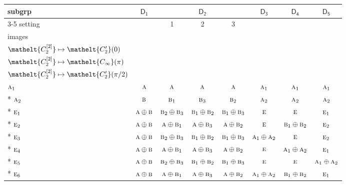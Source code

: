 \documentclass[10pt,a4paper]{article}
\numberwithin{equation}{section}
\newcommand{\eltfont}[1]{{\let\sigma\eltsigma\mathelt{#1}}}
\newcommand{\grp}[1]{\mathsf{#1}}
\newcommand{\irr}[1]{\text{\normalfont\scshape #1}}
\newcommand{\cls}[1]{\eltfont{#1}}
\newcommand{\elt}[1]{\eltfont{#1}}
\newcommand{\genidx}[2]{#1^{[\mathrm{#2}]}}
\begin{document}
{\small\begin{longtable}{@{}lccccccc@{}}\toprule
subgrp & \href{D1.pdf}{$\grp{D_{1}}$} & \multicolumn{3}{c}{\href{D2.pdf}{$\grp{D_{2}}$}} & \href{D3.pdf}{$\grp{D_{3}}$} & \href{D4.pdf}{$\grp{D_{4}}$} & \href{D5.pdf}{$\grp{D_{5}}$}\\\cmidrule(lr){3-5}
setting &  & 1 & 2 & 3 &  &  & \\
images &  & {\scriptsize\begin{tabular}[t]{@{}c@{}}$\cls{\genidx{C_{2}}{1}} \mapsto \elt{C_{\infty}}(\pi)$\\$\cls{\genidx{C_{2}}{2}} \mapsto \elt{C_2'}(0)$\end{tabular}} & {\scriptsize\begin{tabular}[t]{@{}c@{}}$\cls{\genidx{C_{2}}{1}} \mapsto \elt{C_2'}(0)$\\$\cls{\genidx{C_{2}}{2}} \mapsto \elt{C_{\infty}}(\pi)$\end{tabular}} & {\scriptsize\begin{tabular}[t]{@{}c@{}}$\cls{\genidx{C_{2}}{1}} \mapsto \elt{C_2'}(0)$\\$\cls{\genidx{C_{2}}{2}} \mapsto \elt{C_2'}(\pi/2)$\end{tabular}} &  &  & \\\midrule\endhead
\bottomrule\endfoot\endlastfoot
$\irr{a}_{1}$ & $\irr{a}$ & $\irr{a}$ & $\irr{a}$ & $\irr{a}$ & $\irr{a}_{1}$ & $\irr{a}_{1}$ & $\irr{a}_{1}$\\*
$\irr{a}_{2}$ & $\irr{b}$ & $\irr{b}_{1}$ & $\irr{b}_{3}$ & $\irr{b}_{2}$ & $\irr{a}_{2}$ & $\irr{a}_{2}$ & $\irr{a}_{2}$\\*
$\irr{e}_{1}$ & $\irr{a}\oplus \irr{b}$ & $\irr{b}_{2}\oplus \irr{b}_{3}$ & $\irr{b}_{1}\oplus \irr{b}_{2}$ & $\irr{b}_{1}\oplus \irr{b}_{3}$ & $\irr{e}$ & $\irr{e}$ & $\irr{e}_{1}$\\*
$\irr{e}_{2}$ & $\irr{a}\oplus \irr{b}$ & $\irr{a}\oplus \irr{b}_{1}$ & $\irr{a}\oplus \irr{b}_{3}$ & $\irr{a}\oplus \irr{b}_{2}$ & $\irr{e}$ & $\irr{b}_{1}\oplus \irr{b}_{2}$ & $\irr{e}_{2}$\\*
$\irr{e}_{3}$ & $\irr{a}\oplus \irr{b}$ & $\irr{b}_{2}\oplus \irr{b}_{3}$ & $\irr{b}_{1}\oplus \irr{b}_{2}$ & $\irr{b}_{1}\oplus \irr{b}_{3}$ & $\irr{a}_{1}\oplus \irr{a}_{2}$ & $\irr{e}$ & $\irr{e}_{2}$\\*
$\irr{e}_{4}$ & $\irr{a}\oplus \irr{b}$ & $\irr{a}\oplus \irr{b}_{1}$ & $\irr{a}\oplus \irr{b}_{3}$ & $\irr{a}\oplus \irr{b}_{2}$ & $\irr{e}$ & $\irr{a}_{1}\oplus \irr{a}_{2}$ & $\irr{e}_{1}$\\*
$\irr{e}_{5}$ & $\irr{a}\oplus \irr{b}$ & $\irr{b}_{2}\oplus \irr{b}_{3}$ & $\irr{b}_{1}\oplus \irr{b}_{2}$ & $\irr{b}_{1}\oplus \irr{b}_{3}$ & $\irr{e}$ & $\irr{e}$ & $\irr{a}_{1}\oplus \irr{a}_{2}$\\*
$\irr{e}_{6}$ & $\irr{a}\oplus \irr{b}$ & $\irr{a}\oplus \irr{b}_{1}$ & $\irr{a}\oplus \irr{b}_{3}$ & $\irr{a}\oplus \irr{b}_{2}$ & $\irr{a}_{1}\oplus \irr{a}_{2}$ & $\irr{b}_{1}\oplus \irr{b}_{2}$ & $\irr{e}_{1}$\\
\bottomrule\end{longtable}}
\end{document}
